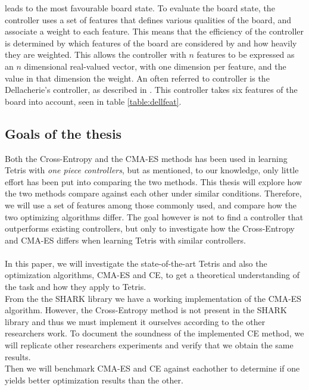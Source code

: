 leads to the most favourable board state. To evaluate the board 
state, the controller uses a set of features that defines 
various qualities of the board, and associate a weight to each 
feature. This means that the efficiency of the controller 
is determined by which features of the board are considered by
and how heavily they are weighted. This allows
the controller with $n$ features to be expressed as an 
$n$ dimensional real-valued vector, with one dimension 
per feature, and the value in that dimension the weight.
An often referred to controller is the Dellacherie's controller, 
as described in \cite{scherrer2009}. This controller
takes six features of the board into account, seen in table 
\ref{table:dellfeat}.



\subsection{Goals of the thesis}

Both the Cross-Entropy and the CMA-ES methods has been used 
in learning Tetris with \textit{one piece controllers}, but as 
mentioned, to our knowledge, only little effort has been put into 
comparing the two methods. This thesis will explore
how the two methods compare against each other under similar
conditions. Therefore, we will use a set of features among those
commonly used, and compare how the two optimizing algorithms 
differ. The goal however is not to find a controller that 
outperforms existing controllers, but only to investigate 
how the Cross-Entropy and CMA-ES differs when learning Tetris
with similar controllers.\\
\\
In this paper, we will investigate the state-of-the-art Tetris and also the optimization 
algorithms, CMA-ES and CE, to get a theoretical understanding of the task and how they 
apply to Tetris.\\
From the the SHARK library \citep{shark08} we have a working implementation of the CMA-ES 
algorithm. However, the Cross-Entropy method is not present in the SHARK library and thus 
we must implement it ourselves according to the other researchers work. To document the 
soundness of the implemented CE method, we will replicate other researchers experiments and 
verify that we obtain the same results.\\
Then we will benchmark CMA-ES and CE against eachother 
to determine if one yields better optimization results than the other.
